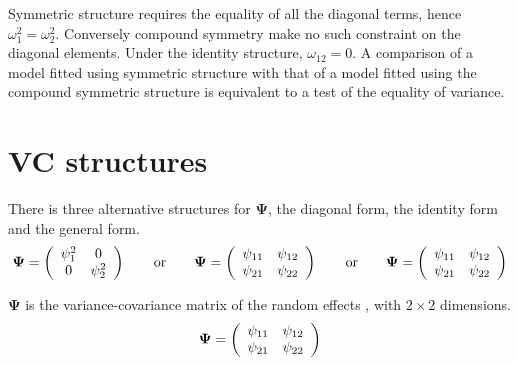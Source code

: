 \documentclass[12pt, a4paper]{report}
\theoremstyle{plain}
\theoremstyle{definition}
\theoremstyle{remark}
\begin{document}
	Symmetric structure requires the equality of all the diagonal terms, hence $\omega^2_1 = \omega^2_2$. Conversely compound symmetry make no such constraint on the diagonal elements. Under the identity structure, $\omega_{12} = 0$.
	A comparison of a model fitted using symmetric structure with that of a model fitted using the compound symmetric structure is equivalent to a test of the equality of variance.
	
	
	
	
\section{VC structures}
	
	There is three alternative structures for
	$\boldsymbol{\Psi}$, the diagonal form, the identity form and the general form.
	\[
	\boldsymbol{\Psi} =
	\left(%
	\begin{array}{c c}
	\psi^2_1 & 0  \\
	0 & \psi^2_2  \\
	\end{array}%
	\right)\qquad \mathrm{or} \qquad \boldsymbol{\Psi} =
	\left(%
	\begin{array}{c c}
	\psi_{11} & \psi_{12}  \\
	\psi_{21} & \psi_{22}  \\
	\end{array}%
	\right)
	\qquad \mathrm{or} \qquad \boldsymbol{\Psi} =
	\left(%
	\begin{array}{c c}
	\psi_{11} & \psi_{12}  \\
	\psi_{21} & \psi_{22}  \\
	\end{array}%
	\right)
	\]
	
	$\boldsymbol{\Psi}$ is the variance-covariance matrix of the random effects ,
	with $2 \times 2$ dimensions.
	\begin{equation}
	\boldsymbol{\Psi} =
	\left(%
	\begin{array}{c c}
	\psi_{11} & \psi_{12}  \\
	\psi_{21} & \psi_{22}  \\
	\end{array}%
	\right)
	\end{equation}
	
	
	
\end{document}

